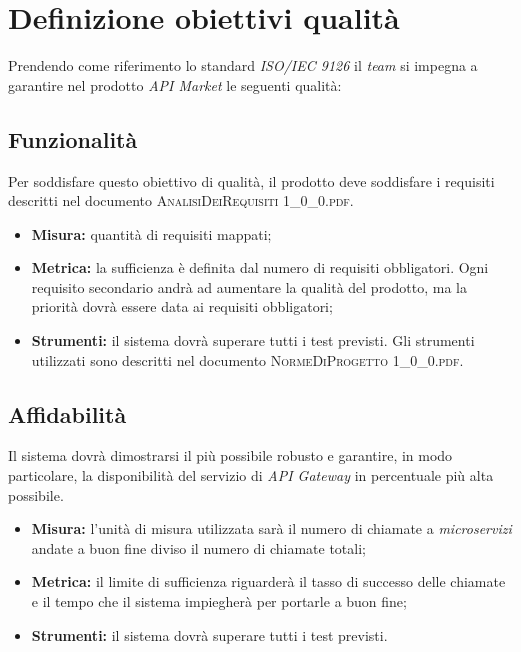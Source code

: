 \newpage
\section{Definizione obiettivi qualità}
	
	Prendendo come riferimento lo standard \textit{ISO/IEC 9126} il \textit{team} si impegna a
	garantire nel prodotto \textit{API Market} le seguenti qualità:
	
	\subsection{Funzionalità}
		Per soddisfare questo obiettivo di qualità, il prodotto deve soddisfare i requisiti descritti nel documento \textsc{AnalisiDeiRequisiti 1\_0\_0.pdf}.  
		
		\begin{itemize}
			\item \textbf{Misura: }quantità di requisiti mappati;
			\item \textbf{Metrica: }la sufficienza è definita dal numero di requisiti obbligatori. Ogni requisito secondario andrà ad aumentare la qualità del prodotto, ma la priorità dovrà essere data ai requisiti obbligatori;
			\item \textbf{Strumenti: }il sistema dovrà superare tutti i test previsti. Gli strumenti utilizzati sono descritti nel documento \textsc{NormeDiProgetto 1\_0\_0.pdf}.
			
		\end{itemize}
	
	\subsection{Affidabilità}
		Il sistema dovrà dimostrarsi il più possibile robusto e garantire, in modo particolare, la disponibilità del servizio di \textit{API Gateway} in percentuale più alta possibile. 
		
		\begin{itemize}
			\item \textbf{Misura:} l'unità di misura utilizzata sarà il numero di chiamate a \textit{microservizi} andate a buon fine diviso il numero di chiamate totali;
			\item \textbf{Metrica: }il limite di sufficienza riguarderà il tasso di successo delle chiamate e il tempo che il sistema impiegherà per portarle a buon fine;
			\item \textbf{Strumenti: }il sistema dovrà superare tutti i test previsti.
			
		\end{itemize}
	
